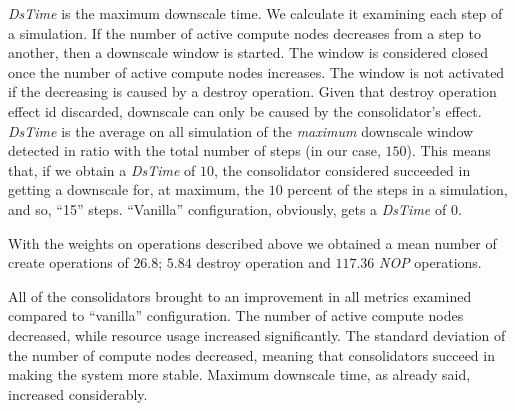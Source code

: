 \textit{DsTime} is the maximum downscale time. We calculate it examining each step of a simulation. If the number of active compute nodes decreases from a step to another, then a downscale window is started. The window is considered closed once the number of active compute nodes increases. The window is not activated if the decreasing is caused by a destroy operation. Given that destroy operation effect id discarded, downscale can only be caused by the consolidator's effect. \textit{DsTime} is the average on all simulation of the \emph{maximum} downscale window detected in ratio with the total number of steps (in our case, $150$). This means that, if we obtain a \textit{DsTime} of $10$, the consolidator considered succeeded in getting a downscale for, at maximum, the $10$ percent of the steps in a simulation, and so, ``15'' steps. ``Vanilla'' configuration, obviously, gets a \textit{DsTime} of $0$.

With the weights on operations described above we obtained a mean number of create operations of $26.8$; $5.84$ destroy operation and $117.36$ \textit{NOP} operations.

All of the consolidators brought to an improvement in all metrics examined compared to ``vanilla'' configuration. The number of active compute nodes decreased, while resource usage increased significantly. The standard deviation of the number of compute nodes decreased, meaning that consolidators succeed in making the system more stable. Maximum downscale time, as already said, increased considerably.

